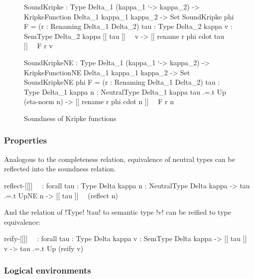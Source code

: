 \documentclass[sigplan,10pt,anonymous,review]{acmart}\settopmatter{printfolios=true,printccs=false,printacmref=false}
\begin{document}
\begin{figure}
\begin{agda}
SoundKripke : Type Delta_1 (kappa_1 `-> kappa_2) -> 
              KripkeFunction Delta_1  kappa_1  kappa_2 -> Set 
SoundKripke phi F = 
  (r : Renaming Delta_1  Delta_2) 
  {tau : Type Delta_2 kappa} {v : SemType Delta_2 kappa}
  [[ tau ]]~~ v -> 
  [[ rename r phi cdot tau ]]~~ F r v

SoundKripkeNE : Type Delta_1 (kappa_1 `-> kappa_2) -> 
                KripkeFunctionNE Delta_1  kappa_1  kappa_2 -> Set
SoundKripkeNE phi F = 
  (r : Renaming Delta_1 Delta_2) 
  {tau : Type Delta_1 kappa} {n : NeutralType Delta_1 kappa}
  tau .=.t Up (eta-norm n) -> 
  [[ rename r phi cdot n ]]~~ F r n
\end{agda}
\caption{Soundness of Kripke functions}
\label{fig:soundKripke}
\end{figure}
 
\subsubsection{Properties}

Analogous to the completeness relation, equivalence of neutral types can be reflected into the soundness relation.

\begin{agda}
reflect-[[]]~~ : forall {tau : Type Delta kappa} 
                 {n : NeutralType Delta kappa} -> 
                 tau .=.t UpNE n  -> [[ tau ]]~~ (reflect n)
\end{agda}

\Ni And the relation of !Type! !tau! to semantic type !v! can be reified to type equivalence: 

\begin{agda}
reify-[[]]~~ : forall {tau : Type Delta kappa}
               {v : SemType Delta kappa} -> 
               [[ tau ]]~~ v -> 
               tau .=.t Up (reify v)
\end{agda}



\subsubsection{Logical environments}
\end{document}
